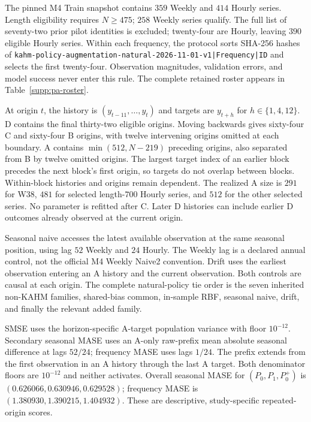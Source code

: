 The pinned M4 Train snapshot contains $359$ Weekly and $414$ Hourly
series. Length eligibility requires $N\geq475$; $258$ Weekly series
qualify. The full list of seventy-two prior pilot identities is
excluded; twenty-four are Hourly, leaving $390$ eligible Hourly series.
Within each frequency, the protocol sorts SHA-256 hashes of
\texttt{kahm-policy-augmentation-natural-2026-11-01-v1|Frequency|ID}
and selects the first twenty-four. Observation magnitudes, validation
errors, and model success never enter this rule. The complete retained
roster appears in Table~\ref{supp:pa-roster}.

\begin{table}[t]
\centering\small
\caption{Complete natural-series roster from the fixed identity-hash
rule. These forty-eight anonymous identities are benchmark units, not
asserted independent application sources.}
\label{supp:pa-roster}

\end{table}

At origin $t$, the history is $(y_{t-11},\ldots,y_t)$ and targets are
$y_{t+h}$ for $h\in\{1,4,12\}$. D contains the final thirty-two
eligible origins. Moving backwards gives sixty-four C and sixty-four
B origins, with twelve intervening origins omitted at each boundary.
A contains $\min(512,N-219)$ preceding origins, also separated from B
by twelve omitted origins. The largest target index of an earlier
block precedes the next block's first origin, so targets do not overlap
between blocks. Within-block histories and origins remain dependent.
The realized A size is $291$ for W38, $481$ for selected length-$700$
Hourly series, and $512$ for the other selected series. No parameter
is refitted after C. Later D histories can include earlier D outcomes
already observed at the current origin.

Seasonal naive accesses the latest available observation at the same
seasonal position, using lag $52$ Weekly and $24$ Hourly. The Weekly
lag is a declared annual control, not the official M4 Weekly Naive2
convention. Drift uses the earliest observation entering an A history
and the current observation. Both controls are causal at each origin.
The complete natural-policy tie order is the seven inherited non-KAHM
families, shared-bias common, in-sample RBF, seasonal naive, drift, and
finally the relevant added family.

SMSE uses the horizon-specific A-target population variance with floor
$10^{-12}$. Secondary seasonal MASE uses an A-only raw-prefix mean
absolute seasonal difference at lags $52/24$; frequency MASE uses
lags $1/24$. The prefix extends from the first observation in an A
history through the last A target. Both denominator floors are
$10^{-12}$ and neither activates. Overall seasonal MASE for
$(P_0,P_1,P_0^+)$ is $(0.626066,0.630946,0.629528)$; frequency MASE is
$(1.380930,1.390215,1.404932)$. These are descriptive,
study-specific repeated-origin scores.

